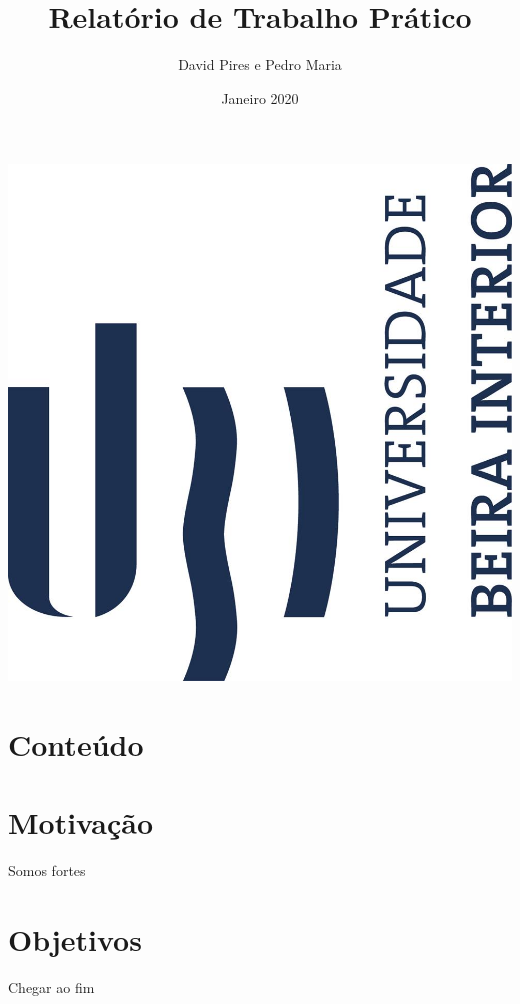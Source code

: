 \documentclass{article}
\title{Relatório de Trabalho Prático}
\author{David Pires e Pedro Maria}
\date{Janeiro 2020}
\begin{document}
\begin{titlepage}
    \maketitle

    \includegraphics[scale=0.5]{logo_ubi_vprincipal.jpg}

\end{titlepage}

\section{Conteúdo}

\tableofcontents

\newpage

\section{Motivação}

Somos fortes

\section{Objetivos}

Chegar ao fim

\newpage
\end{document}
